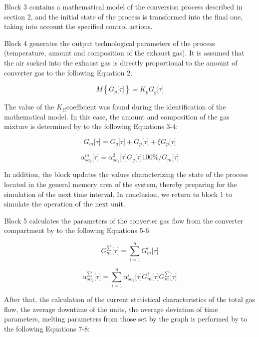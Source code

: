 \begin{multicols}{2}
Block 3 contains a mathematical model of the conversion process
described in section 2, and the initial state of the process is
transformed into the final one, taking into account the specified
control actions.

Block 4 generates the output technological parameters of the process
(temperature, amount and composition of the exhaust gas). It is assumed
that the air sucked into the exhaust gas is directly proportional to the
amount of converter gas to the following Equation 2.

\begin{equation}
M\left\{ G_{p}\lbrack\tau\rbrack \right\} = K_{p}G_{g}\lbrack\tau\rbrack
\end{equation}

The value of the \(K_{П}\)coefficient was found during the
identification of the mathematical model. In this case, the amount and
composition of the gas mixture is determined by to the following
Equations 3-4:

\begin{equation}
G_{m}\lbrack\tau\rbrack=G_{g}\lbrack\tau\rbrack + G_{p}\lbrack\tau\rbrack+ξG_{p}\lbrack\tau\rbrack
\end{equation}

\begin{equation}
\alpha_{{so}_{2}}^{m}\lbrack\tau\rbrack = \alpha_{{so}_{2}}^{2}\lbrack\tau\rbrack G_{g}\lbrack\tau\rbrack 100\%/G_{m}\lbrack\tau\rbrack
\end{equation}

In addition, the block updates the values characterizing the state of
the process located in the general memory area of the system, thereby
preparing for the simulation of the next time interval. In conclusion,
we return to block 1 to simulate the operation of the next unit.

Block 5 calculates the parameters of the converter gas flow from the
converter compartment by to the following Equations 5-6:

\begin{equation}
G_{m}^{\sum}\lbrack\tau\rbrack = \sum_{i = 1}^{n}G_{m}^{i}\lbrack\tau\rbrack
\end{equation}

\begin{equation}
\alpha_{{so}_{2}}^{\sum}\lbrack\tau\rbrack = \sum_{i = 1}^{n}\alpha_{{so}_{2}}^{i}\lbrack\tau\rbrack G_{m}^{i}\lbrack\tau\rbrack G_{m}^{\sum}\lbrack\tau\rbrack
\end{equation}

After that, the calculation of the current statistical characteristics
of the total gas flow, the average downtime of the units, the average
deviation of time parameters, melting parameters from those set by the
graph is performed by to the following Equations 7-8:
\end{multicols}

